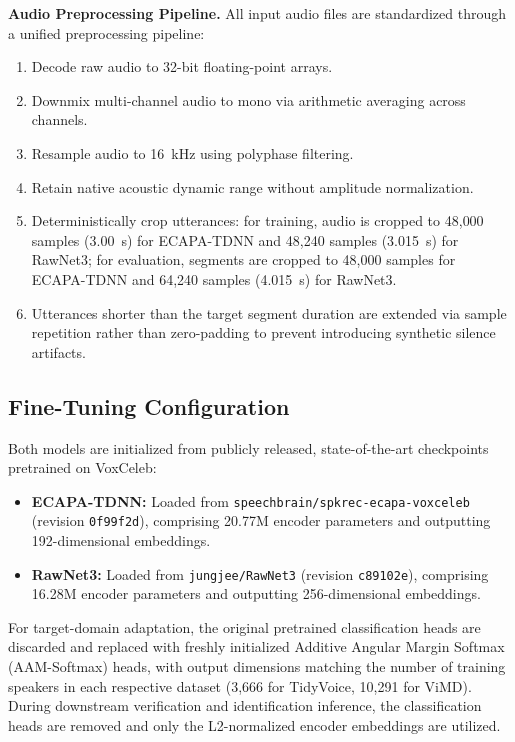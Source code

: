 \textbf{Audio Preprocessing Pipeline.} All input audio files are standardized through a unified preprocessing pipeline:
\begin{enumerate}
    \item Decode raw audio to 32-bit floating-point arrays.
    \item Downmix multi-channel audio to mono via arithmetic averaging across channels.
    \item Resample audio to 16~kHz using polyphase filtering.
    \item Retain native acoustic dynamic range without amplitude normalization.
    \item Deterministically crop utterances: for training, audio is cropped to 48{,}000 samples (3.00~s) for ECAPA-TDNN and 48{,}240 samples (3.015~s) for RawNet3; for evaluation, segments are cropped to 48{,}000 samples for ECAPA-TDNN and 64{,}240 samples (4.015~s) for RawNet3.
    \item Utterances shorter than the target segment duration are extended via sample repetition rather than zero-padding to prevent introducing synthetic silence artifacts.
\end{enumerate}

\subsection{Fine-Tuning Configuration}

Both models are initialized from publicly released, state-of-the-art checkpoints pretrained on VoxCeleb:
\begin{itemize}
    \item \textbf{ECAPA-TDNN:} Loaded from \texttt{speechbrain/spkrec-ecapa-voxceleb} (revision \texttt{0f99f2d}), comprising 20.77M encoder parameters and outputting 192-dimensional embeddings.
    \item \textbf{RawNet3:} Loaded from \texttt{jungjee/RawNet3} (revision \texttt{c89102e}), comprising 16.28M encoder parameters and outputting 256-dimensional embeddings.
\end{itemize}

For target-domain adaptation, the original pretrained classification heads are discarded and replaced with freshly initialized Additive Angular Margin Softmax (AAM-Softmax) \cite{deng2019arcface} heads, with output dimensions matching the number of training speakers in each respective dataset (3{,}666 for TidyVoice, 10{,}291 for ViMD). During downstream verification and identification inference, the classification heads are removed and only the L2-normalized encoder embeddings are utilized.

